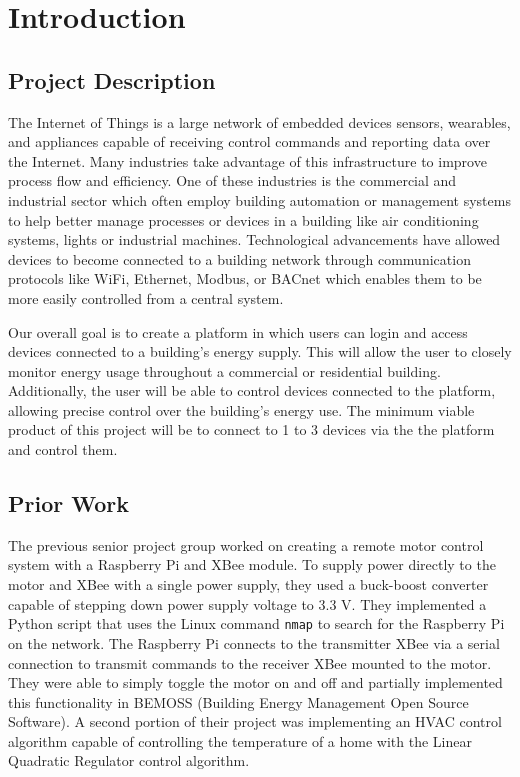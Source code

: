 \chapter{Introduction}
\label{ch: Chapter1}

\section{Project Description}
The Internet of Things is a large network of embedded devices
 sensors,
wearables, and appliances capable of receiving control commands and reporting
data over the Internet. Many industries take advantage of this infrastructure to
improve process flow and efficiency. One of these industries is the commercial
and industrial sector which often employ building automation or management
systems to help better manage processes or devices in a building like air
conditioning systems, lights or industrial machines. Technological advancements
have allowed devices to become connected to a building network through
communication protocols like WiFi, Ethernet, Modbus, or BACnet which enables
them to be more easily controlled from a central system.


Our overall goal is to create a platform in which users can login and access devices
connected to a building's energy supply. This will allow the user to closely
monitor energy usage throughout a commercial or residential building.
Additionally, the user will be able to control devices connected to the
platform, allowing precise control over the building's energy use. The minimum
viable product of this project will be to connect to 1 to 3 devices via the the
platform and control them.

\section{Prior Work}
The previous senior project group worked on creating a remote motor control system with a Raspberry Pi and XBee module. To supply power directly to the motor and XBee with a single power supply, they used a buck-boost converter capable of stepping down power supply voltage to 3.3 V. They implemented a Python script that uses the Linux command \texttt{nmap} to search for the Raspberry Pi on the network. The Raspberry Pi connects to the transmitter XBee via a serial connection to transmit commands to the receiver XBee mounted to the motor. They were able to simply toggle the motor on and off and partially implemented this functionality in BEMOSS (Building Energy Management Open Source Software). A second portion of their project was implementing an HVAC control algorithm capable of controlling the temperature of a home with the Linear Quadratic Regulator control algorithm.

